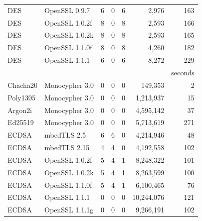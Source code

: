 \begin{table}[]
\begin{tabular}{llrrrrr}
      DES &  OpenSSL 0.9.7       & 6                      & 0                   & 6                    & 2,976         & 163    \\
      DES &  OpenSSL 1.0.2f     & 8                      & 0                   & 8                    & 2,593         & 166     \\
      DES &  OpenSSL 1.0.2k     & 8                      & 0                   & 8                    & 2,593        & 165     \\
      DES &  OpenSSL 1.1.0f      & 8                      & 0                   & 8                    & 4,260         & 182     \\
      DES &   OpenSSL 1.1.1    & 6                      & 0                   & 6                    & 8,272         & 229     \\
                         &    &                    &                     &                      &                  & seconds                  \\\cline{7-7}
      Chacha20 &  Monocypher 3.0    & 0          & 0                   & 0                    & 149,353        & 2         \\  
      Poly1305 &  Monocypher 3.0    & 0          & 0                   & 0                    & 1,213,937      & 15     \\
      Argon2i &   Monocypher 3.0    & 0         & 0                   & 0                    & 4,595,142       & 37    \\
      Ed25519 &   Monocypher 3.0    & 0       & 0                   & 0                    & 5,713,619       & 271     \\
      ECDSA &   mbedTLS 2.5   & 6       &    6                & 0                    &  4,214,946     &  48    \\ 
      ECDSA &   mbedTLS 2.15   &   4                   &   4                 & 0                    &  4,192,558    & 102        \\   
      ECDSA &    OpenSSL 1.0.2f   &  5                    & 4                   & 1                    &  8,248,322       & 101     \\   
      ECDSA &   OpenSSL 1.0.2k     &  5                    & 4                   & 1                    &  8,263,599      & 100      \\   
      ECDSA &   OpenSSL 1.1.0f  &  5                    & 4                   & 1                    &  6,100,465       & 76     \\  
      ECDSA &   OpenSSL 1.1.1       & 0                      &  0                   &    0               &  10,244,076       &  121      \\  
      ECDSA &   OpenSSL 1.1.1g    & 0         &  0       &  0           &  9,266,191          & 102    \\  


\end{tabular}
\end{table}
